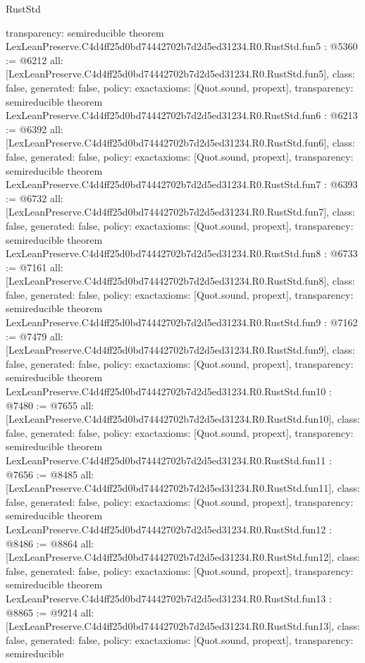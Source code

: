 \begin{lexlean}{RustStd}
\begin{coremodule}
{  transparency: semireducible
}
theorem LexLeanPreserve.C4d4ff25d0bd74442702b7d2d5ed31234.R0.RustStd.fun5 : @5360 := @6212 {
  all: [LexLeanPreserve.C4d4ff25d0bd74442702b7d2d5ed31234.R0.RustStd.fun5],
  class: false,
  generated: false,
  policy: exact{axioms: [Quot.sound, propext]},
  transparency: semireducible
}
theorem LexLeanPreserve.C4d4ff25d0bd74442702b7d2d5ed31234.R0.RustStd.fun6 : @6213 := @6392 {
  all: [LexLeanPreserve.C4d4ff25d0bd74442702b7d2d5ed31234.R0.RustStd.fun6],
  class: false,
  generated: false,
  policy: exact{axioms: [Quot.sound, propext]},
  transparency: semireducible
}
theorem LexLeanPreserve.C4d4ff25d0bd74442702b7d2d5ed31234.R0.RustStd.fun7 : @6393 := @6732 {
  all: [LexLeanPreserve.C4d4ff25d0bd74442702b7d2d5ed31234.R0.RustStd.fun7],
  class: false,
  generated: false,
  policy: exact{axioms: [Quot.sound, propext]},
  transparency: semireducible
}
theorem LexLeanPreserve.C4d4ff25d0bd74442702b7d2d5ed31234.R0.RustStd.fun8 : @6733 := @7161 {
  all: [LexLeanPreserve.C4d4ff25d0bd74442702b7d2d5ed31234.R0.RustStd.fun8],
  class: false,
  generated: false,
  policy: exact{axioms: [Quot.sound, propext]},
  transparency: semireducible
}
theorem LexLeanPreserve.C4d4ff25d0bd74442702b7d2d5ed31234.R0.RustStd.fun9 : @7162 := @7479 {
  all: [LexLeanPreserve.C4d4ff25d0bd74442702b7d2d5ed31234.R0.RustStd.fun9],
  class: false,
  generated: false,
  policy: exact{axioms: [Quot.sound, propext]},
  transparency: semireducible
}
theorem LexLeanPreserve.C4d4ff25d0bd74442702b7d2d5ed31234.R0.RustStd.fun10 : @7480 := @7655 {
  all: [LexLeanPreserve.C4d4ff25d0bd74442702b7d2d5ed31234.R0.RustStd.fun10],
  class: false,
  generated: false,
  policy: exact{axioms: [Quot.sound, propext]},
  transparency: semireducible
}
theorem LexLeanPreserve.C4d4ff25d0bd74442702b7d2d5ed31234.R0.RustStd.fun11 : @7656 := @8485 {
  all: [LexLeanPreserve.C4d4ff25d0bd74442702b7d2d5ed31234.R0.RustStd.fun11],
  class: false,
  generated: false,
  policy: exact{axioms: [Quot.sound, propext]},
  transparency: semireducible
}
theorem LexLeanPreserve.C4d4ff25d0bd74442702b7d2d5ed31234.R0.RustStd.fun12 : @8486 := @8864 {
  all: [LexLeanPreserve.C4d4ff25d0bd74442702b7d2d5ed31234.R0.RustStd.fun12],
  class: false,
  generated: false,
  policy: exact{axioms: [Quot.sound, propext]},
  transparency: semireducible
}
theorem LexLeanPreserve.C4d4ff25d0bd74442702b7d2d5ed31234.R0.RustStd.fun13 : @8865 := @9214 {
  all: [LexLeanPreserve.C4d4ff25d0bd74442702b7d2d5ed31234.R0.RustStd.fun13],
  class: false,
  generated: false,
  policy: exact{axioms: [Quot.sound, propext]},
  transparency: semireducible
}
\end{coremodule}
\end{lexlean}
